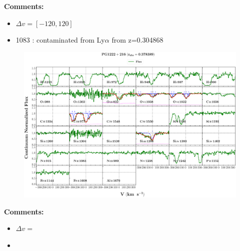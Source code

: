 \documentclass[12pt]{report}
\newcommand\ion[2]{\text{#1\,\textsc{\lowercase{#2}}}}
\begin{document}
\textbf{Comments:}

\begin{itemize}
    \item $\Delta v = [-120,120]$
    \item \ion{N}{ii} 1083 : contaminated from Ly$\alpha$ from z=0.304868
\end{itemize}


\begin{landscape}

    \begin{figure}
        \centering
        \vspace{-20mm}
        \hspace*{-35mm}
        \includegraphics[width=1.25\linewidth]{sys_plots_full/PG1222+216_z=0.378389_sys_plot_full.png}
    \end{figure}
    
\end{landscape}


\textbf{Comments:}

\begin{itemize}
    \item $\Delta v = $
    \item 
\end{itemize}
\end{document}
